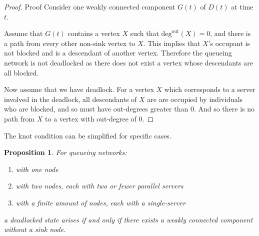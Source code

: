\documentclass{article}
\newtheorem{proposition}{Proposition}
\numberwithin{equation}{section}
\begin{document}
\begin{proof}{Proof}
Consider one weakly connected component $G(t)$ of $D(t)$ at time $t$.

Assume that $G(t)$ contains a vertex $X$ such that $\text{deg}^{\text{out}}(X) = 0$, and there is a path from every other non-sink vertex to $X$.
This implies that $X$'s occupant is not blocked and is a descendant of another vertex.
Therefore the queueing network is not deadlocked as there does not exist a vertex whose descendants are all blocked.

Now assume that we have deadlock.
For a vertex $X$ which corresponds to a server involved in the deadlock, all descendants of $X$ are are occupied by individuals who are blocked, and so must have out-degrees greater than 0.
And so there is no path from $X$ to a vertex with out-degree of 0.

\end{proof}

The knot condition can be simplified for specific cases.

\begin{proposition}
For queueing networks:
\begin{enumerate}
  \item with one node
  \item with two nodes, each with two or fewer parallel servers
  \item with a finite amount of nodes, each with a single-server
\end{enumerate}
a deadlocked state arises if and only if there exists a weakly connected component without a sink node.
\end{proposition}
\end{document}
